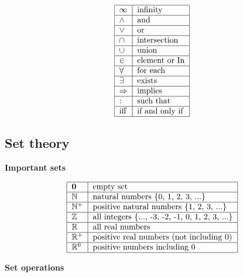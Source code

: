 \documentclass[justified, sixbynine]{tufte-book}
\def\subsubsection#1{{\bf #1}}
\theoremstyle{plain}%
\newtheorem * {corollary}{Corollary}
\theoremstyle{definition}
\theoremstyle{remark}
\newtheorem * {remark}{Remark}
\newtheorem * {note}{Note}
\begin{document}
\begin{fullwidth}
\begin{equation}
\begin{tabular}{|l|l|}
\hline
$\infty $ & infinity \\ \hline
$\wedge $ & and \\ \hline
$\vee $ & or \\ \hline
$\cap $ & intersection \\ \hline
$\cup $ & union \\ \hline
$\in $ & element or In \\ \hline
$\forall $ & for each \\ \hline
$\exists $ & exists \\ \hline
$\Rightarrow $ & implies \\ \hline
: & such that \\ \hline
iff & if and only if \\ \hline
\end{tabular}
\end{equation}

\goodbreak\subsection{Set theory}

\subsubsection{Important sets}

\begin{equation}
\begin{tabular}{|l|l|}
\hline
${\bf 0}$ & empty set \\ \hline
$\mathbb{N}$ & natural numbers \{0, 1, 2, 3, ...\} \\ \hline
$\mathbb{N}^{+}$ & positive natural numbers \{1, 2, 3, ...\} \\ \hline
$\mathbb{Z}$ & all integers \{..., -3, -2, -1, 0, 1, 2, 3, ...\} \\ \hline
$\mathbb{R}$ & all real numbers \\ \hline
$\mathbb{R}^{+}$ & positive real numbers (not including 0) \\ \hline
$\mathbb{R}^{0}$ & positive numbers including 0 \\ \hline
\end{tabular}
\end{equation}

\subsubsection{Set operations}


\end{fullwidth}
\end{document}
